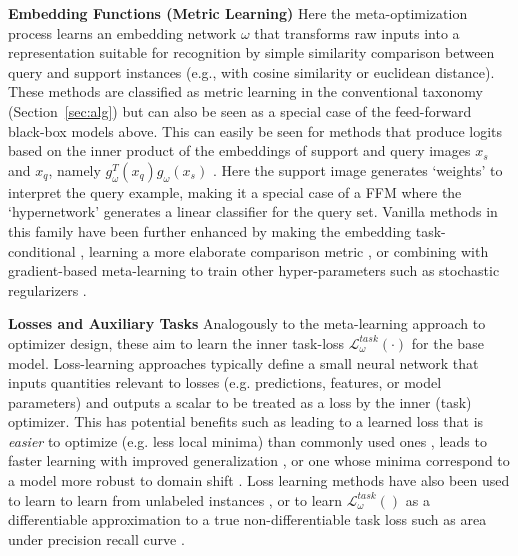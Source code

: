 \documentclass[10pt,journal,compsoc]{IEEEtran}
\newcommand{\keypoint}[1]{\vspace{0.1cm}\noindent\textbf{#1}\quad}
\begin{document}
\keypoint{Embedding Functions (Metric Learning)}
Here the meta-optimization process learns an embedding network $\omega$ that transforms raw inputs into a representation suitable for recognition by simple similarity comparison between query and support instances \cite{qiao2017parametersfromactivations,chen2019closerfewshot,vinyals2016matching,snell2017prototypicalnets} (e.g., with cosine similarity or euclidean distance). These methods are classified as metric learning in the conventional taxonomy (Section~\ref{sec:alg}) but can also be seen as a special case of the feed-forward black-box models above. This can easily be seen for methods that produce logits based on the inner product of the embeddings of support and query images $x_s$ and $x_q$, namely $g^T_\omega(x_{q}) g_\omega(x_{s})$ \cite{qiao2017parametersfromactivations,chen2019closerfewshot}. Here the support image generates `weights' to interpret the query example, making it a special case of a FFM where the `hypernetwork' generates a linear classifier for the query set. Vanilla methods in this family have been further enhanced by making the embedding task-conditional \cite{oreshkin2018tadam,antoniou2019learning}, learning a more elaborate comparison metric \cite{sung2018relationnet,garcia2018fewshot}, or combining with gradient-based meta-learning to train other hyper-parameters such as stochastic regularizers \cite{tseng2020crossdomain}.


\keypoint{Losses and Auxiliary Tasks} Analogously to the meta-learning approach to optimizer design, these  aim to learn the inner task-loss $\mathcal{L}_\omega^{task}(\cdot)$ for the base model. Loss-learning approaches typically define a small neural network that inputs quantities relevant to losses (e.g. predictions, features, or model parameters) and outputs a scalar to be treated as a loss by the inner (task) optimizer. This has potential benefits such as leading to a learned loss that is \emph{easier} to optimize (e.g. less local minima) than commonly used ones \cite{houthooft2018epg,sung2017learning,zhou2020online}, leads to faster learning with improved generalization \cite{denevi2018l2lmean,denevi2019online,gonzalez2019baikalloss,bechtle2019metaLoss}, or one whose minima correspond to a model more robust to domain shift \cite{li2019featurecritic}. Loss learning methods have also been used to learn to learn from unlabeled instances \cite{antoniou2019learning,semifewmaml2018}, or to learn $\mathcal{L}_\omega^{task}()$ as a differentiable approximation to a true non-differentiable task loss such as area under precision recall curve \cite{huang2019lossmetric,grabocka2019surrogateloss}.
\end{document}

